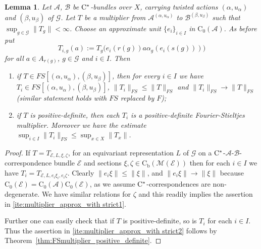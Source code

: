 \documentclass[11 pt, leqno]{amsart}
\numberwithin{equation}{section}
\theoremstyle{plain}
\newtheorem {lem} [thm]{Lemma}
\theoremstyle{definition}
\newcommand*{\contz}{\mathrm{C_0}}%
\newcommand*{\contb}{\mathrm{C_b}}%
\newcommand{\B}{\mathcal B}
\newcommand{\M}{\mathcal M}
\newcommand{\G}{\mathcal G} %
\newcommand{\EE}{\mathcal E}
\newcommand{\A}{\mathcal A}
\newcommand{\cst}{\ifmmode\mathrm{C}^*\else{$\mathrm{C}^*$}\fi}
\begin{document}
\begin{lem}\label{lem:multiplier_approx_with strict2}
Let $\A$, $\B$  be $\cst$-bundles over $X$, carrying twisted actions $(\alpha,u_\alpha)$ and $(\beta,u_\beta)$ of $\G$. 
Let $T$ be a multiplier from $\A^{(\alpha,u_{\alpha})}$ to $\B^{(\beta,u_{\beta})}$ such that $\sup_{g\in \G} \| T_g \|<\infty$. 
Choose an approximate unit $\{e_i\}_{i\in I}$ in $\contz(\A)$. As before put
\[
    T_{i,g}(a) := T_g \big( e_i(r(g)) a \alpha_g(e_i(s(g))) \big)
\] 
for all $a\in A_{r(g)}$, $g\in \G$ and $i\in I$.  
Then
\begin{enumerate}
    \item\label{ite:multiplier_approx_with strict1} if $T\in FS[(\alpha,u_{\alpha}), (\beta,u_{\beta})]$, then for every $i \in I$ we have $T_i \in FS[(\alpha,u_{\alpha}), (\beta,u_{\beta})]$, $\|T_i\|_{FS}\leq \|T\|_{FS}$ and $\|T_i\|_{FS}\to \|T\|_{FS}$ (similar statement holds with $FS$ replaced by $F$);
    \item\label{ite:multiplier_approx_with strict2} if $T$ is positive-definite, then each $T_{i}$ is a  positive-definite Fourier-Stieltjes multiplier. Moreover we have the estimate $\sup_{i\in I} \| T_i \|_{FS} \leq \sup_{x\in X} \|T_{x}\|$.
\end{enumerate}
\end{lem}
\begin{proof}

If $T = T_{\EE,L,\xi,\zeta}$, for an equivariant representation $L$ of $\G$ on a $\cst$-$\A$-$\B$-correspondence bundle $\EE$ and sections $\xi,\zeta\in \contb(\M(\EE))$ then for each $i \in I$ we have $T_i=T_{\EE,L,e_i\xi_i,e_i\zeta}$.
Clearly $\|e_i\xi\|\leq \|\xi\|$, and $\|e_i\xi\|\to \|\xi\|$ because $\contz(\EE)=\contz(\A)\contz(\EE)$, as we assume $\cst$-correspondences are non-degenerate.  
We have similar relations for $\zeta$ and this readily implies the assertion in \ref{ite:multiplier_approx_with strict1}.

Further one can easily check that if $T$ is positive-definite, so is $T_i$ for each $i \in I$.
Thus the assertion in \ref{ite:multiplier_approx_with strict2} follows by Theorem~\ref{thm:FSmultiplier_positive_definite}.
\end{proof}
\end{document}
